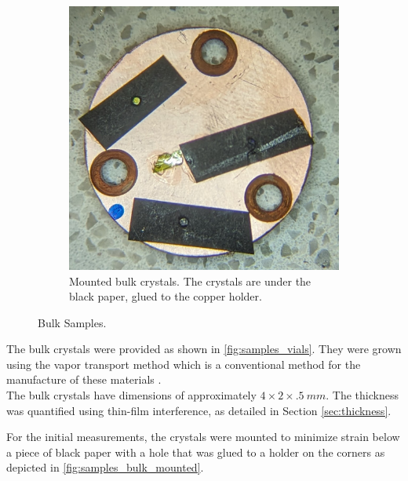 \documentclass[
	oneside,
	parskip=half,
	a4paper,
]{scrbook}
\begin{document}
\begin{figure}
	\begin{subfigure}[c]{.25\textwidth}
		\includegraphics[width=\textwidth]{../figures/mounted_bulk_samples.jpg}
		\caption{Mounted bulk crystals. The crystals are under the black paper, glued to the copper holder.}	
		\label{fig:samples_bulk_mounted}
	\end{subfigure}
	\caption{Bulk Samples.}
\end{figure}
The bulk crystals were provided as shown in \autoref{fig:samples_vials}.
They were grown using the vapor transport method which is a conventional method for the manufacture of these materials \cite{review_tmd,AFM_review}.\\
The bulk crystals have dimensions of approximately $4 \times 2 \times \SI{.5}{mm}$.
The thickness was quantified using thin-film interference, as detailed in Section \ref{sec:thickness}.

For the initial measurements, the crystals were mounted to minimize strain below a piece of black paper with a hole that was glued to a holder on the corners as depicted in \autoref{fig:samples_bulk_mounted}.
\end{document}
